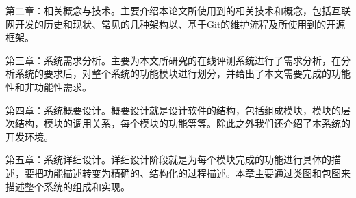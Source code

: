 第二章：相关概念与技术。主要介绍本论文所使用到的相关技术和概念，包括互联网开发的历史和现状、常见的几种架构以、基于Git的维护流程及所使用到的开源框架。

第三章：系统需求分析。主要为本文所研究的在线评测系统进行了需求分析，在分析系统的要求后，对整个系统的功能模块进行划分，并给出了本文需要完成的功能性和非功能性需求。

第四章：系统概要设计。概要设计就是设计软件的结构，包括组成模块，模块的层次结构，模块的调用关系，每个模块的功能等等。除此之外我们还介绍了本系统的开发环境。

第五章：系统详细设计。详细设计阶段就是为每个模块完成的功能进行具体的描述，要把功能描述转变为精确的、结构化的过程描述。本章主要通过类图和包图来描述整个系统的组成和实现。
